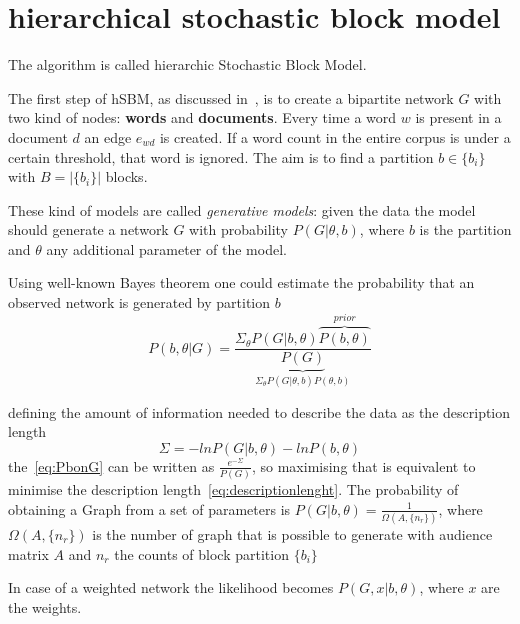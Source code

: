 \appendix
{}
\chapter{hierarchical stochastic block model}\label{app:hsbm}
The algorithm is called hierarchic Stochastic Block Model.

The first step of hSBM, as discussed in~\cite{peixoto2014efficient},
is to create a bipartite network $G$ with two kind of nodes: \textbf{words} and \textbf{documents}.
Every time a word $w$ is present in a document $d$ an edge $e_{wd}$ is created.
If a word count in the entire corpus is under a certain threshold, that word is ignored.
The aim is to find a partition $b\in\{b_i\}$ with $B=\left|\{b_i\}\right|$ blocks.

These kind of models are called \textit{generative models}: given the data the model
should generate a network $G$ with probability $P(G|\theta, b)$, where $b$ is
the partition and $\theta$ any additional parameter of the model.

Using well-known Bayes theorem one could estimate the probability that an
observed network is generated by partition $b$
\begin{equation}\label{eq:PbonG}
  P(b,\theta|G)=\frac{\Sigma_{\theta}P(G|b,\theta)\overbrace{P(b,\theta)}^{prior}}{\underbrace{P(G)}_{\Sigma_{\theta}P(G|\theta, b)P(\theta, b)}}
\end{equation}

defining the amount of information needed to describe the data as the description length
\begin{equation}\label{eq:descriptionlenght}
  \Sigma=-lnP(G|b,\theta)-lnP(b, \theta)
\end{equation}
the~\ref{eq:PbonG} can be written as $\frac{e^{-\Sigma}}{P(G)}$, so maximising that is equivalent to minimise the description length~\ref{eq:descriptionlenght}. The probability of obtaining a Graph from a set of parameters is $P(G|b,\theta)=\frac{1}{\Omega(A,\{n_r\})}$, where $\Omega(A,\{n_r\})$ is the number of graph that is possible to generate with audience matrix $A$ and $n_r$ the counts of block partition $\{b_i\}$

In case of a weighted network the likelihood becomes $P(G,x|b,\theta)$, where $x$
are the weights.

